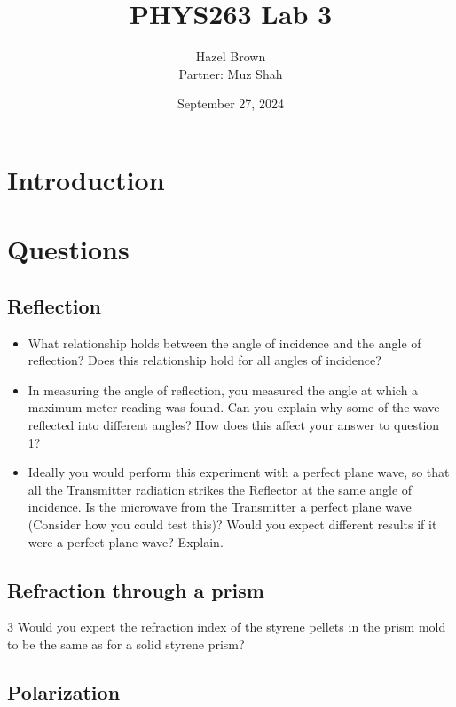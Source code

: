 \documentclass{article}
\title{PHYS263 Lab 3}
\author{Hazel Brown\\[1ex]
\small{Partner: Muz Shah}}
\date{September 27, 2024}
\begin{document}
\maketitle

\section{Introduction}



\section{Questions}

\subsection{Reflection}

\begin{itemize}
    \item What relationship holds between the angle of incidence and the angle of reflection? Does this relationship hold for all angles of incidence?

    \item In measuring the angle of reflection, you measured the angle at which a maximum meter reading was found. Can you explain why some of the wave reflected into different angles? How does this affect your answer to question 1?

    \item Ideally you would perform this experiment with a perfect plane wave, so that all the Transmitter radiation strikes the Reflector at the same angle of incidence. Is the microwave from the Transmitter a perfect plane wave (Consider how you could test this)? Would you expect different results if it were a perfect plane wave? Explain.


    
\end{itemize}

\subsection{Refraction through a prism}
3
Would you expect the refraction index of the styrene pellets in the prism mold to be the same as for a solid styrene prism?

\subsection{Polarization}
\end{document}
